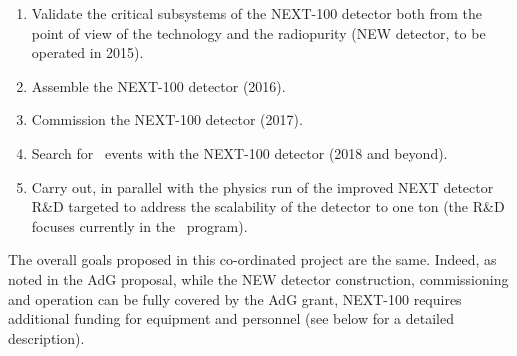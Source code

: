 \begin{enumerate}
\item Validate the critical subsystems of the NEXT-100 detector both from the point of view of the technology and the radiopurity (NEW detector, to be operated in 2015). 
\item Assemble the NEXT-100 detector (2016).
\item Commission the NEXT-100 detector (2017).
\item Search for \bbonu\ events with the NEXT-100 detector (2018 and beyond).
\item Carry out, in parallel with the physics run of the improved NEXT detector R\&D targeted to address the scalability of the detector to one ton (the R\&D focuses currently in the \BATA\ program).
\end{enumerate}

The overall goals proposed in this co-ordinated project are the same. Indeed, as noted in the AdG proposal, while the NEW detector construction, commissioning and operation can be fully covered by the AdG grant, NEXT-100 requires additional funding for equipment and personnel (see below for a detailed description). 

